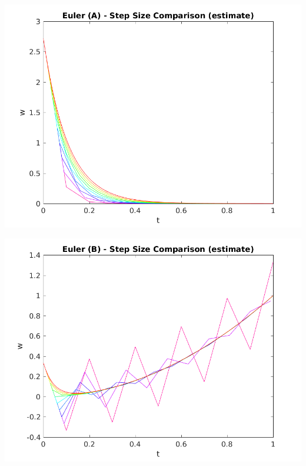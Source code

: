 \documentclass{article}
\begin{document}
\begin{center}
	\centering
    \begin{minipage}{0.5\textwidth}
        \centering
	    \includegraphics[width=1\textwidth]{../output/a_euler_h_val.png}
    \end{minipage}\hfill
    \begin{minipage}{0.5\textwidth}
        \centering
	    \includegraphics[width=1\textwidth]{../output/b_euler_h_val.png}
    \end{minipage}
 	\label{fig:true}
\end{center}
\end{document}
